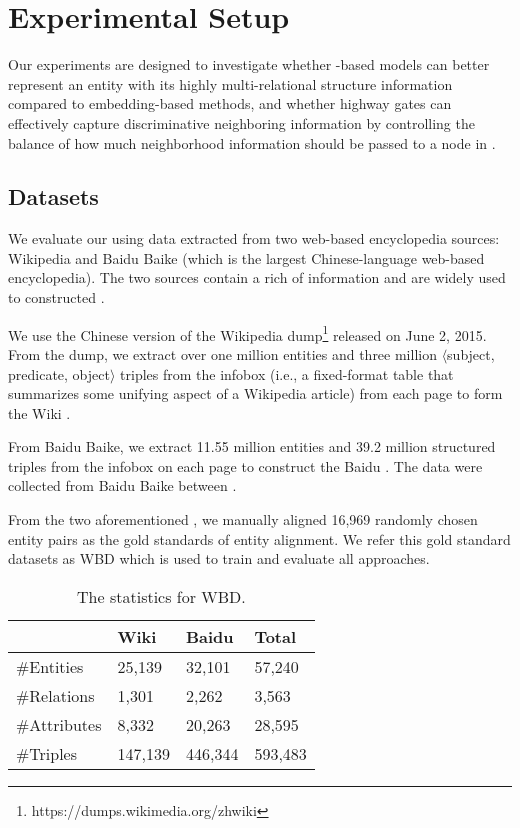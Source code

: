 \section{Experimental Setup}
	Our experiments are designed to investigate whether \RGCN-based models can better represent an entity with its highly multi-relational
structure information compared to \KG embedding-based methods, and whether highway gates can effectively capture discriminative neighboring
information by controlling the balance of how much neighborhood information should be passed to a node in \RGCN.

\subsection{Datasets}
	We evaluate our using data extracted from two web-based encyclopedia sources: Wikipedia and Baidu Baike (which is the largest Chinese-language web-based encyclopedia). The two sources contain a rich of information and are widely used to constructed \KGs.
	
	We use the Chinese version of the Wikipedia dump\footnote{https://dumps.wikimedia.org/zhwiki} released on June 2, 2015.
    From the dump, we extract over one million entities and three million $\langle$subject, predicate, object$\rangle$ triples from the infobox (i.e., a fixed-format table that summarizes some unifying aspect of a Wikipedia article) from each page to form the Wiki \KG.
	
	 From Baidu Baike, we extract 11.55 million entities and 39.2 million structured triples from the infobox on each page to construct the Baidu \KG. The data were collected from Baidu Baike between .

	
	 From the two aforementioned  \KGs, we manually aligned 16,969 randomly chosen entity pairs as the gold standards of entity alignment. We refer this gold standard datasets as WBD which is used to train and evaluate all approaches.
	

	\begin{table}
		\centering
		\begin{tabular}{llll}
			\toprule
			& Wiki & Baidu & Total \\
			\midrule
			\#Entities & 25,139 & 32,101 & 57,240 \\
			\#Relations & 1,301 & 2,262 & 3,563 \\
			\#Attributes & 8,332 & 20,263 & 28,595 \\
			\#Triples & 147,139 & 446,344 & 593,483 \\
			\bottomrule
		\end{tabular}
		\caption{The statistics for WBD.}
		\label{dataset}
	\end{table}
	

